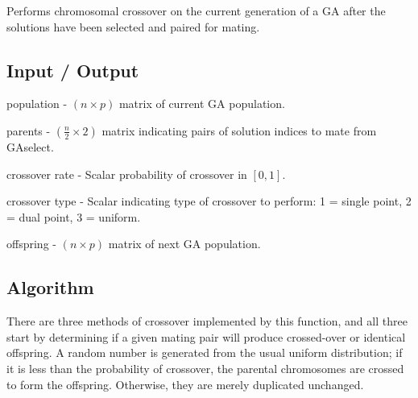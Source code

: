 \documentclass{book}
\newcommand{\textcode}[1]{\textsf{\small #1}}   %
\begin{document}
Performs chromosomal crossover on the current generation of a GA after the
solutions have been selected and paired for mating.

\subsection*{Input / Output}

\begin{compactitem}

\item \textcode{population} - $\left( n \times p \right)$ matrix of current GA population.

\item \textcode{parents} - $\left( \frac{n}{2} \times 2 \right)$ matrix indicating pairs of solution indices to mate from \textcode{GAselect}.

\item \textcode{crossover rate} - Scalar probability of crossover in $\left[0,1\right]$.

\item \textcode{crossover type} - Scalar indicating type of crossover to perform: 1 =  single point, 2 =  dual point, 3 =  uniform.

\item \textcode{offspring} - $\left( n \times p \right)$ matrix of next GA population.

\end{compactitem}

\subsection*{Algorithm}

There are three methods of crossover implemented by this function, and all
three start by determining if a given mating pair will produce crossed-over
or identical offspring. A random number is generated from the usual uniform
distribution; if it is less than the probability of crossover, the parental
chromosomes are crossed to form the offspring. Otherwise, they are merely
duplicated unchanged.
\end{document}
